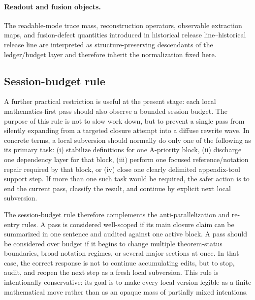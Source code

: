 \documentclass[12pt,a4paper]{article}
\DeclareRobustCommand{\QSCver}[1]{archival stage}
\renewcommand{\QSCver}[1]{historical release line}
\begin{document}
\paragraph{Readout and fusion objects.}
The readable-mode trace mass, reconstruction operators, observable extraction maps,
and fusion-defect quantities introduced in \QSCver{v2.9.0}--\QSCver{v2.11.0} are interpreted as
structure-preserving descendants of the ledger/budget layer and therefore inherit the
normalization fixed here.



\subsection*{Session-budget rule}
A further practical restriction is useful at the present stage: each local mathematics-first pass should also observe a bounded session budget. The purpose of this rule is not to slow work down, but to prevent a single pass from silently expanding from a targeted closure attempt into a diffuse rewrite wave. In concrete terms, a local subversion should normally do only one of the following as its primary task: (i) stabilize definitions for one A-priority block, (ii) discharge one dependency layer for that block, (iii) perform one focused reference/notation repair required by that block, or (iv) close one clearly delimited appendix-tool support step. If more than one such task would be required, the safer action is to end the current pass, classify the result, and continue by explicit next local subversion.

The session-budget rule therefore complements the anti-parallelization and re-entry rules. A pass is considered well-scoped if its main closure claim can be summarized in one sentence and audited against one active block. A pass should be considered over budget if it begins to change multiple theorem-status boundaries, broad notation regimes, or several major sections at once. In that case, the correct response is not to continue accumulating edits, but to stop, audit, and reopen the next step as a fresh local subversion. This rule is intentionally conservative: its goal is to make every local version legible as a finite mathematical move rather than as an opaque mass of partially mixed intentions.
\end{document}
